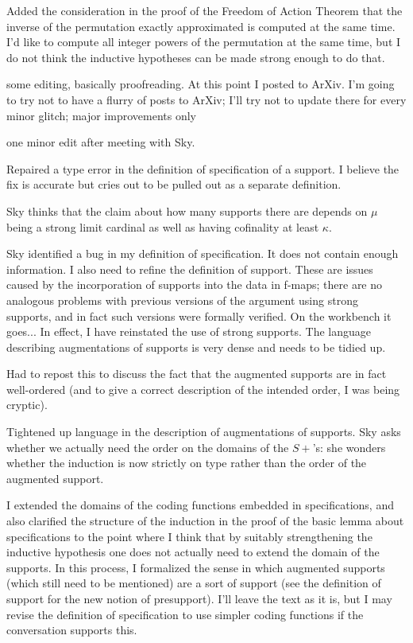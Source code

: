 \documentclass[112pt]{article}
\begin{document}
\begin{description}
\item[11/20/2023:]  Added the consideration in the proof of the Freedom of Action Theorem that the inverse of the permutation exactly approximated is computed at the same time.  I'd like to compute all integer powers of the permutation at the same time, but I do not think the inductive hypotheses can be made strong enough to do that.

\item[11/21/2023:]  some editing, basically proofreading.  At this point I posted to ArXiv.  I'm going to try not to have a flurry of posts to ArXiv;  I'll try not to update there for every minor glitch;  major improvements only

\item[11/21/2023:]  one minor edit after meeting with Sky.

\item[1/2/2024:]  Repaired a type error in the definition of specification of a support.  I believe the fix is accurate but cries out to be pulled out as a separate definition.

\item Sky thinks that the claim about how many supports there are depends on $\mu$ being a strong limit cardinal as well as having cofinality at least $\kappa$.

\item[2/8/2024:]  Sky identified a bug in my definition of specification.  It does not contain enough information.  I also need to refine the definition of support.  These are issues caused by the incorporation of supports into the data in f-maps;  there are no analogous problems with previous versions of the argument using strong supports,
and in fact such versions were formally verified.  On the workbench it goes...  In effect, I have reinstated the use of strong supports.  The language describing augmentations of supports is very dense and needs to be tidied up.

Had to repost this to discuss the fact that the augmented supports are in fact well-ordered (and to give a correct description of the intended order, I was being cryptic).

\item[2/27/2024:]  Tightened up language in the description of augmentations of supports.  Sky asks whether we actually need the order on the domains of the $S+$'s:  she wonders whether the induction is now strictly on type rather than the order of the augmented support.

\item[3/5/2024:]  I extended the domains of the coding functions embedded in specifications, and also clarified the structure of the induction in the proof of the basic lemma about specifications to the point where I think that by suitably strengthening the inductive hypothesis one does not actually need to extend the domain of the supports.
In this process, I formalized the sense in which augmented supports (which still need to be mentioned) are a sort of support (see the definition of support for the new notion of presupport).  I'll leave the text as it is, but I may revise the definition of specification to use simpler coding functions if the conversation supports this.\


\end{description}
\end{document}
